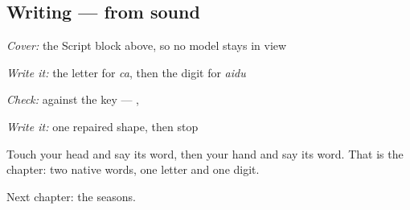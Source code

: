 \subsection*{Writing — from sound}
\emph{Cover:} the Script block above, so no model stays in view

\emph{Write it:} the letter for \emph{ca}, then the digit for \emph{aidu}

\emph{Check:} against the key — \textbf{}, \textbf{}

\emph{Write it:} one repaired shape, then stop

\begin{tcolorbox}[breakable,colback=teal!4,colframe=teal!35!black,title={Before you move on}]
Touch your head and say its word, then your hand and say its word. That is the chapter: two native words, one letter and one digit.

Next chapter: the seasons.
\end{tcolorbox}
